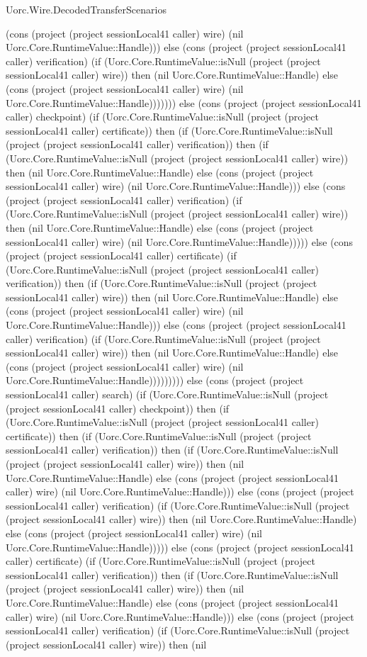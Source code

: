 \begin{lexlean}{Uorc.Wire.DecodedTransferScenarios}
\begin{semanticmodule}
{(cons (project (project sessionLocal41 caller) wire) (nil Uorc.Core.RuntimeValue::Handle))) else (cons (project (project sessionLocal41 caller) verification) (if (Uorc.Core.RuntimeValue::isNull (project (project sessionLocal41 caller) wire)) then (nil Uorc.Core.RuntimeValue::Handle) else (cons (project (project sessionLocal41 caller) wire) (nil Uorc.Core.RuntimeValue::Handle))))))) else (cons (project (project sessionLocal41 caller) checkpoint) (if (Uorc.Core.RuntimeValue::isNull (project (project sessionLocal41 caller) certificate)) then (if (Uorc.Core.RuntimeValue::isNull (project (project sessionLocal41 caller) verification)) then (if (Uorc.Core.RuntimeValue::isNull (project (project sessionLocal41 caller) wire)) then (nil Uorc.Core.RuntimeValue::Handle) else (cons (project (project sessionLocal41 caller) wire) (nil Uorc.Core.RuntimeValue::Handle))) else (cons (project (project sessionLocal41 caller) verification) (if (Uorc.Core.RuntimeValue::isNull (project (project sessionLocal41 caller) wire)) then (nil Uorc.Core.RuntimeValue::Handle) else (cons (project (project sessionLocal41 caller) wire) (nil Uorc.Core.RuntimeValue::Handle))))) else (cons (project (project sessionLocal41 caller) certificate) (if (Uorc.Core.RuntimeValue::isNull (project (project sessionLocal41 caller) verification)) then (if (Uorc.Core.RuntimeValue::isNull (project (project sessionLocal41 caller) wire)) then (nil Uorc.Core.RuntimeValue::Handle) else (cons (project (project sessionLocal41 caller) wire) (nil Uorc.Core.RuntimeValue::Handle))) else (cons (project (project sessionLocal41 caller) verification) (if (Uorc.Core.RuntimeValue::isNull (project (project sessionLocal41 caller) wire)) then (nil Uorc.Core.RuntimeValue::Handle) else (cons (project (project sessionLocal41 caller) wire) (nil Uorc.Core.RuntimeValue::Handle))))))))) else (cons (project (project sessionLocal41 caller) search) (if (Uorc.Core.RuntimeValue::isNull (project (project sessionLocal41 caller) checkpoint)) then (if (Uorc.Core.RuntimeValue::isNull (project (project sessionLocal41 caller) certificate)) then (if (Uorc.Core.RuntimeValue::isNull (project (project sessionLocal41 caller) verification)) then (if (Uorc.Core.RuntimeValue::isNull (project (project sessionLocal41 caller) wire)) then (nil Uorc.Core.RuntimeValue::Handle) else (cons (project (project sessionLocal41 caller) wire) (nil Uorc.Core.RuntimeValue::Handle))) else (cons (project (project sessionLocal41 caller) verification) (if (Uorc.Core.RuntimeValue::isNull (project (project sessionLocal41 caller) wire)) then (nil Uorc.Core.RuntimeValue::Handle) else (cons (project (project sessionLocal41 caller) wire) (nil Uorc.Core.RuntimeValue::Handle))))) else (cons (project (project sessionLocal41 caller) certificate) (if (Uorc.Core.RuntimeValue::isNull (project (project sessionLocal41 caller) verification)) then (if (Uorc.Core.RuntimeValue::isNull (project (project sessionLocal41 caller) wire)) then (nil Uorc.Core.RuntimeValue::Handle) else (cons (project (project sessionLocal41 caller) wire) (nil Uorc.Core.RuntimeValue::Handle))) else (cons (project (project sessionLocal41 caller) verification) (if (Uorc.Core.RuntimeValue::isNull (project (project sessionLocal41 caller) wire)) then (nil }
\end{semanticmodule}
\end{lexlean}
